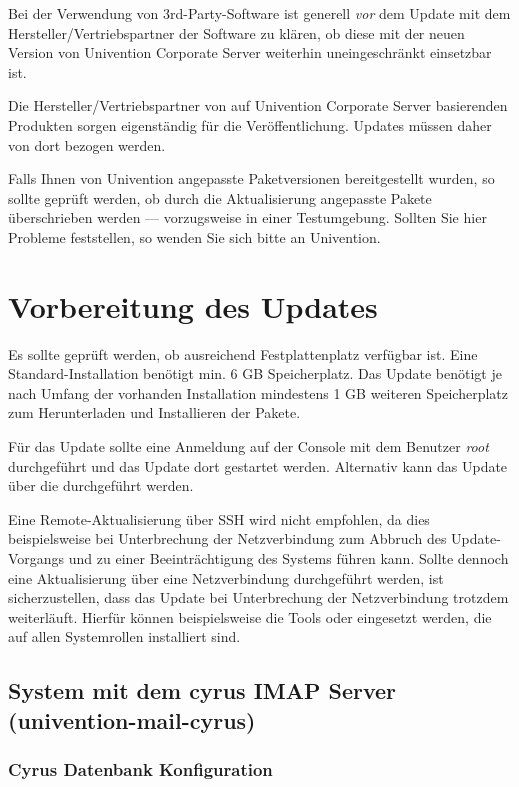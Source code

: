 Bei der Verwendung von 3rd-Party-Software ist generell \emph{vor} dem Update
mit dem Hersteller/Vertriebspartner der Software zu klären, ob
diese mit der neuen Version von Univention Corporate Server weiterhin
uneingeschränkt einsetzbar ist. 

Die Hersteller/Vertriebspartner von auf Univention Corporate Server
basierenden Produkten sorgen eigenständig für die Veröffentlichung. Updates
müssen daher von dort bezogen werden.

Falls Ihnen von Univention angepasste Paketversionen bereitgestellt wurden, so
sollte geprüft werden, ob durch die Aktualisierung angepasste Pakete
überschrieben werden --- vorzugsweise in einer Testumgebung. Sollten Sie hier
Probleme feststellen, so wenden Sie sich bitte an Univention.

\chapter{Vorbereitung des Updates}
Es sollte geprüft werden, ob ausreichend Festplattenplatz verfügbar ist. Eine
Standard-Installation benötigt min. 6 GB Speicherplatz. Das
Update benötigt je nach Umfang der vorhanden Installation mindestens 1 GB
weiteren Speicherplatz zum Herunterladen und Installieren der Pakete.

Für das Update sollte eine Anmeldung auf der Console mit dem
Benutzer \emph{root} durchgeführt und das Update dort gestartet werden.
Alternativ kann das Update über die \ucsUMC{} durchgeführt werden.

Eine Remote-Aktualisierung über SSH wird nicht empfohlen, da dies
beispielsweise bei Unterbrechung der Netzverbindung zum Abbruch des
Update-Vorgangs und zu einer Beeinträchtigung des Systems führen kann. Sollte
dennoch eine Aktualisierung über eine Netzverbindung durchgeführt werden, ist
sicherzustellen, dass das Update bei Unterbrechung der Netzverbindung trotzdem
weiterläuft. Hierfür können beispielsweise die Tools  oder
 eingesetzt werden, die auf allen Systemrollen installiert sind.

\section{System mit dem cyrus IMAP Server (univention-mail-cyrus)}

\subsection{Cyrus Datenbank Konfiguration}

